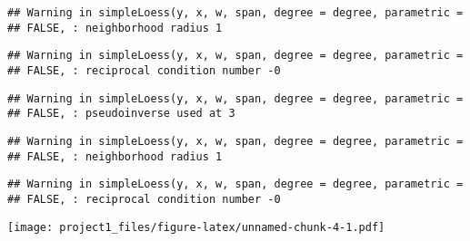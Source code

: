 \documentclass[]{article}
\newenvironment{Shaded}{\begin{snugshade}}{\end{snugshade}}
\newcommand{\KeywordTok}[1]{\textcolor[rgb]{0.13,0.29,0.53}{\textbf{#1}}}
\newcommand{\DataTypeTok}[1]{\textcolor[rgb]{0.13,0.29,0.53}{#1}}
\newcommand{\DecValTok}[1]{\textcolor[rgb]{0.00,0.00,0.81}{#1}}
\newcommand{\StringTok}[1]{\textcolor[rgb]{0.31,0.60,0.02}{#1}}
\newcommand{\CommentTok}[1]{\textcolor[rgb]{0.56,0.35,0.01}{\textit{#1}}}
\newcommand{\OperatorTok}[1]{\textcolor[rgb]{0.81,0.36,0.00}{\textbf{#1}}}
\newcommand{\NormalTok}[1]{#1}
\begin{document}
\begin{verbatim}
## Warning in simpleLoess(y, x, w, span, degree = degree, parametric =
## FALSE, : neighborhood radius 1
\end{verbatim}

\begin{verbatim}
## Warning in simpleLoess(y, x, w, span, degree = degree, parametric =
## FALSE, : reciprocal condition number -0
\end{verbatim}

\begin{verbatim}
## Warning in simpleLoess(y, x, w, span, degree = degree, parametric =
## FALSE, : pseudoinverse used at 3
\end{verbatim}

\begin{verbatim}
## Warning in simpleLoess(y, x, w, span, degree = degree, parametric =
## FALSE, : neighborhood radius 1
\end{verbatim}

\begin{verbatim}
## Warning in simpleLoess(y, x, w, span, degree = degree, parametric =
## FALSE, : reciprocal condition number -0
\end{verbatim}

\texttt{[image: project1\_files/figure-latex/unnamed-chunk-4-1.pdf]}

\begin{Shaded}
\end{Shaded}
\end{document}
